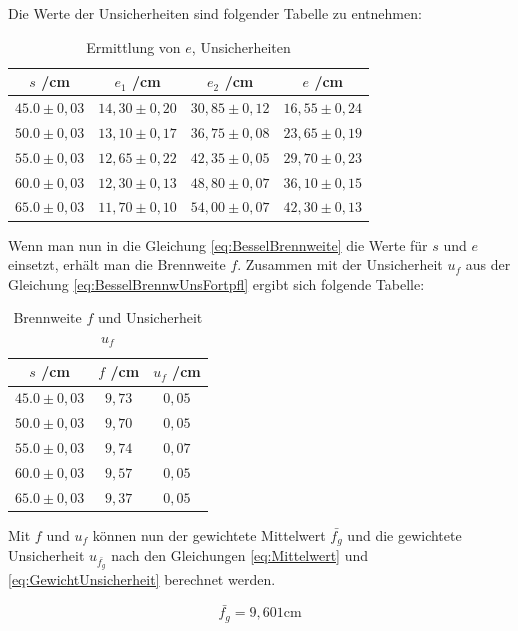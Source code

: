 \documentclass[a4paper,12pt]{article}
\begin{document}
Die Werte der Unsicherheiten sind folgender Tabelle zu entnehmen:

\begin{table}[H]
    \centering
    \begin{tabular}{c|c|c|c}
        $s$ /cm & $e_1$ /cm & $e_2$ /cm & $e$ /cm \\ \hline
        $45.0\pm0,03$ & $14,30\pm0,20$ & $30,85\pm0,12$ & $16,55\pm0,24$ \\
        $50.0\pm0,03$ & $13,10\pm0,17$ & $36,75\pm0,08$ & $23,65\pm0,19$ \\
        $55.0\pm0,03$ & $12,65\pm0,22$ & $42,35\pm0,05$ & $29,70\pm0,23$ \\
        $60.0\pm0,03$ & $12,30\pm0,13$ & $48,80\pm0,07$ & $36,10\pm0,15$ \\
        $65.0\pm0,03$ & $11,70\pm0,10$ & $54,00\pm0,07$ & $42,30\pm0,13$ \\
    \end{tabular}
    \caption{Ermittlung von $e$, Unsicherheiten}
\end{table}

Wenn man nun in die Gleichung \ref{eq:BesselBrennweite} die Werte für $s$ und $e$ einsetzt, erhält man die Brennweite $f$.
Zusammen mit der Unsicherheit $u_f$ aus der Gleichung \ref{eq:BesselBrennwUnsFortpfl} ergibt sich folgende Tabelle:

\begin{table}[H]
    \centering
    \begin{tabular}{c|c|c}
        $s$ /cm & $f$ /cm & $u_f$ /cm \\ \hline
        $45.0\pm0,03$ & $9,73$ & $0,05$ \\
        $50.0\pm0,03$ & $9,70$ & $0,05$ \\
        $55.0\pm0,03$ & $9,74$ & $0,07$ \\
        $60.0\pm0,03$ & $9,57$ & $0,05$ \\
        $65.0\pm0,03$ & $9,37$ & $0,05$ \\
    \end{tabular}
    \caption{Brennweite $f$ und Unsicherheit $u_f$}
\end{table}

Mit $f$ und $u_f$ können nun der gewichtete Mittelwert $\bar{f_g}$ und die gewichtete Unsicherheit $u_{\bar{f_g}}$
nach den Gleichungen \ref{eq:Mittelwert} und \ref{eq:GewichtUnsicherheit} berechnet werden.

\begin{equation*}
    \bar{f_g} = 9,601\mathrm{cm}
\end{equation*}
\end{document}
